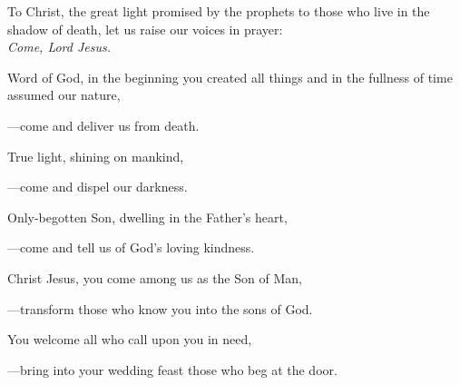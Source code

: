 \intercessions\indent

\begin{hangpar}

To Christ, the great light promised by the prophets to those who live in the shadow of death, let us raise our voices in prayer:\\
\emph{Come, Lord Jesus.}

\medskip Word of God, in the beginning you created all things and in the fullness of time assumed our nature,

{\color{red}---\thinspace}come and deliver us from death.

\medskip True light, shining on mankind,

{\color{red}---\thinspace}come and dispel our darkness.

\medskip Only-begotten Son, dwelling in the Father’s heart,

{\color{red}---\thinspace}come and tell us of God’s loving kindness.

\medskip Christ Jesus, you come among us as the Son of Man,

{\color{red}---\thinspace}transform those who know you into the sons of God.

\medskip You welcome all who call upon you in need,

{\color{red}---\thinspace}bring into your wedding feast those who beg at the door.

\end{hangpar}